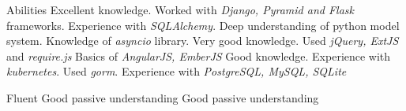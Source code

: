 \begin{rubric}{Abilities}
\entry*[Python]
	Excellent knowledge.\newline
    Worked with \textit{Django, Pyramid and Flask} frameworks. Experience with
    \textit{SQLAlchemy}. Deep understanding of python model system. Knowledge
    of \textit{asyncio} library.
\entry*[JavaScript]
    Very good knowledge. Used \textit{jQuery, ExtJS} and \textit{require.js}
    Basics of \textit{AngularJS, EmberJS}
\entry*[Go]
    Good knowledge. Experience with \textit{kubernetes}. Used \textit{gorm}.
\entry*[Databases]
    Experience with \textit{PostgreSQL, MySQL, SQLite}

\entry*[English]
	Fluent
\entry*[Russian]
	Good passive understanding
	Good passive understanding
\end{rubric}
